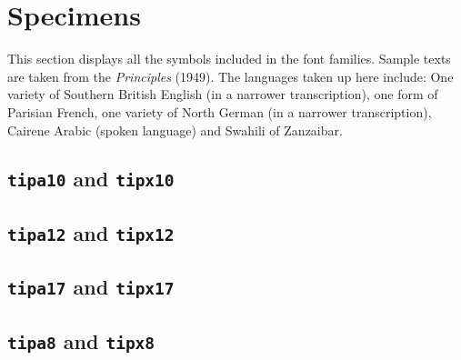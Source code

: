 %
%
%

\raggedbottom

\chapter{Specimens}

This section displays all the symbols included in the \tipa{}
font families. Sample texts are taken from the \emph{Principles}
(1949). The languages taken up here include: One variety of Southern
British English (in a narrower transcription), one form of Parisian
French, one variety of North German (in a narrower transcription),
Cairene Arabic (spoken language) and Swahili of Zanzaibar.

\section{\texttt{tipa10} and \texttt{tipx10}}

\sampletext{\rmtipa\rmfamily\tipaencoding}

\section{\texttt{tipa12} and \texttt{tipx12}}

\sampletext{\large\rmtipa\rmfamily\tipaencoding}

\section{\texttt{tipa17} and \texttt{tipx17}}

\sampletext{\LARGE\rmtipa\rmfamily\tipaencoding}

\section{\texttt{tipa8} and \texttt{tipx8}}

